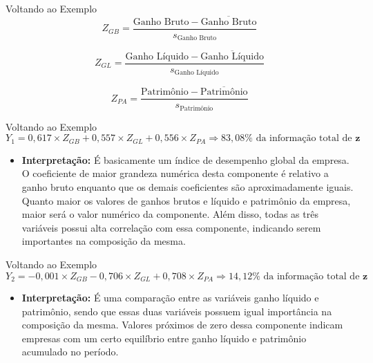 \documentclass[
  ignorenonframetext,
  aspectratio=169,
]{beamer}
\providecommand{\tightlist}{%
  \setlength{\itemsep}{0pt}\setlength{\parskip}{0pt}}
\begin{document}
\begin{frame}{Voltando ao Exemplo}
\label{voltando-ao-exemplo-7}
\[Z_{GB} = \dfrac{\text{Ganho Bruto} - \overline{\text{Ganho Bruto}}}{s_{\text{Ganho Bruto}}}\]

\[Z_{GL} = \dfrac{\text{Ganho Líquido} - \overline{\text{Ganho Líquido}}}{s_{\text{Ganho Líquido}}}\]

\[Z_{PA} = \dfrac{\text{Patrimônio} - \overline{\text{Patrimônio}}}{s_{\text{Patrimônio}}}\]
\end{frame}

\begin{frame}{Voltando ao Exemplo}
\label{voltando-ao-exemplo-8}
\[Y_1 =  0,617 \times Z_{GB} + 0,557 \times Z_{GL} + 0,556 \times Z_{PA} \Longrightarrow
83,08\% \text{ da informação total de } \boldsymbol{z}\]

\pause

\begin{itemize}
\tightlist
\item
  \textbf{Interpretação:} É basicamente um índice de desempenho global
  da empresa. O coeficiente de maior grandeza numérica desta componente
  é relativo a ganho bruto enquanto que os demais coeficientes são
  aproximadamente iguais. Quanto maior os valores de ganhos brutos e
  líquido e patrimônio da empresa, maior será o valor numérico da
  componente. Além disso, todas as três variáveis possui alta correlação
  com essa componente, indicando serem importantes na composição da
  mesma.
\end{itemize}
\end{frame}

\begin{frame}{Voltando ao Exemplo}
\label{voltando-ao-exemplo-9}
\[Y_2 =  -0,001 \times Z_{GB} - 0,706 \times Z_{GL} + 0,708 \times Z_{PA} \Longrightarrow
14,12\% \text{ da informação total de } \boldsymbol{z}\]

\pause

\begin{itemize}
\tightlist
\item
  \textbf{Interpretação:} É uma comparação entre as variáveis ganho
  líquido e patrimônio, sendo que essas duas variáveis possuem igual
  importância na composição da mesma. Valores próximos de zero dessa
  componente indicam empresas com um certo equilíbrio entre ganho
  líquido e patrimônio acumulado no período.
\end{itemize}
\end{frame}
\end{document}
